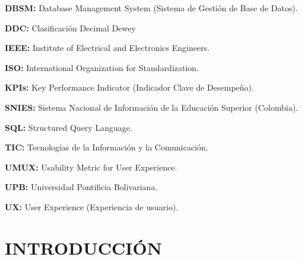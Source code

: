 \documentclass[spanish]{ieee_upb}
\begin{document}
\vspace{0.1cm}
\textbf{DBSM: } Database Management System (Sistema de Gestión de Base de Datos).

\vspace{0.1cm}
\textbf{DDC: } Clasificación Decimal Dewey

\vspace{0.1cm}
\textbf{IEEE: } Institute of Electrical and Electronics Engineers. 

\vspace{0.1cm}
\textbf{ISO: } International Organization for Standardization.

\vspace{0.1cm}
\textbf{KPIs: } Key Performance Indicator (Indicador Clave de Desempeño). 

\vspace{0.1cm}
\textbf{SNIES: } Sistema Nacional de Información de la Educación Superior (Colombia). 

\vspace{0.1cm}
\textbf{SQL: } Structured Query Language. 

\vspace{0.1cm}
\textbf{TIC: } Tecnologías de la Información y la Comunicación.

\vspace{0.1cm}
\textbf{UMUX: } Usability Metric for User Experience.

\vspace{0.1cm}
\textbf{UPB: } Universidad Pontificia Bolivariana.

\vspace{0.1cm}
\textbf{UX: } User Experience (Experiencia de usuario). 



%
%

\newpage
\section{INTRODUCCIÓN}
\end{document}
